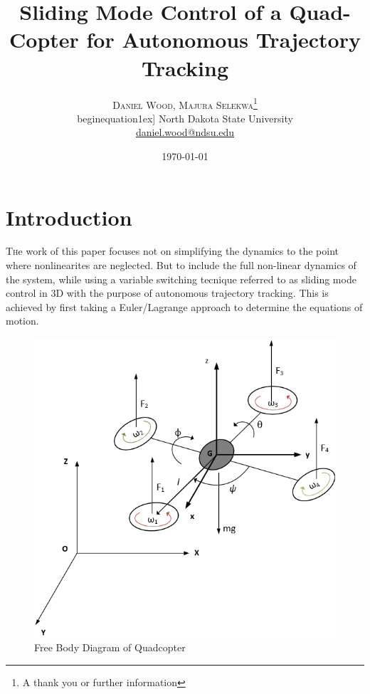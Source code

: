 \documentclass[twoside,twocolumn]{article}
\title{Sliding Mode Control of a Quad-Copter for Autonomous Trajectory Tracking} %
\author{%
\textsc{Daniel Wood, Majura Selekwa}\thanks{A thank you or further information} \\begin{equation}1ex] %
\normalsize North Dakota State University \\ %
\normalsize \href{mailto:daniel.wood@ndsu.edu}{daniel.wood@ndsu.edu} %
}
\date{\today} %
\begin{document}
\maketitle


\section{Introduction}

\lettrine[nindent=0em,lines=3]{T} he work of this paper focuses not on simplifying the dynamics to the point where nonlinearites are neglected. But to include the full non-linear dynamics of the system, while using a variable switching tecnique referred to as sliding mode control in 3D with the purpose of autonomous trajectory tracking. This is achieved by first taking a Euler/Lagrange approach to determine the equations of motion.

\begin{figure}
\includegraphics[scale = 0.5]{drone_diag.png}
\caption{Free Body Diagram of Quadcopter}
\end{figure}
\end{document}
